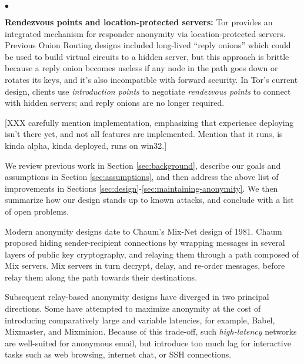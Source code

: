 \documentclass[times,10pt,twocolumn]{article}
\newenvironment{tightlist}{\begin{list}{$\bullet$}{
  \setlength{\itemsep}{0mm}
    \setlength{\parsep}{0mm}
    }}{\end{list}}
\begin{document}
\begin{tightlist}
\item \textbf{Rendezvous points and location-protected servers:} Tor
provides an integrated mechanism for responder anonymity via
location-protected servers.  Previous Onion Routing designs included
long-lived ``reply onions'' which could be used to build virtual
circuits to a hidden server, but this approach is 
brittle because a reply onion becomes useless if any node in the
path goes down or rotates its keys, and it's also
incompatible with forward security.  In Tor's
current design, clients use {\it introduction points} to negotiate {\it
rendezvous points} to connect with hidden servers; and reply onions
are no longer required.
\end{tightlist}

[XXX carefully mention implementation, emphasizing that experience
deploying isn't there yet, and not all features are implemented.
Mention that it runs, is kinda alpha, kinda deployed, runs on win32.]

We review previous work in Section \ref{sec:background}, describe
our goals and assumptions in Section \ref{sec:assumptions},
and then address the above list of improvements in Sections
\ref{sec:design}-\ref{sec:maintaining-anonymity}. We then summarize
how our design stands up to known attacks, and conclude with a list of
open problems.


\label{sec:background}

\label{sec:related-work}
Modern anonymity designs date to Chaum's Mix-Net\cite{chaum-mix} design of
1981.  Chaum proposed hiding sender-recipient connections by wrapping
messages in several layers of public key cryptography, and relaying them
through a path composed of Mix servers.  Mix servers in turn decrypt, delay,
and re-order messages, before relay them along the path towards their
destinations.

Subsequent relay-based anonymity designs have diverged in two
principal directions.  Some have attempted to maximize anonymity at
the cost of introducing comparatively large and variable latencies,
for example, Babel\cite{babel}, Mixmaster\cite{mixmaster-spec}, and
Mixminion\cite{minion-design}.  Because of this
trade-off, such \emph{high-latency} networks are well-suited for anonymous
email, but introduce too much lag for interactive tasks such as web browsing,
internet chat, or SSH connections.
\end{document}
